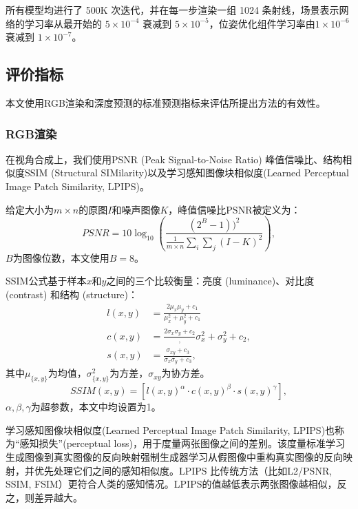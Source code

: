 所有模型均进行了 500K 次迭代，并在每一步渲染一组 1024 条射线，场景表示网络的学习率从最开始的 $5\times10^{-4}$ 衰减到 $5\times10^{-5}$，位姿优化组件学习率由$1\times10^{-6}$ 衰减到 $1\times10^{-7}$。

\subsection{评价指标}
本文使用RGB渲染和深度预测的标准预测指标来评估所提出方法的有效性。
\subsubsection{RGB渲染}
在视角合成上，我们使用PSNR (Peak Signal-to-Noise Ratio) 峰值信噪比、结构相似度SSIM (Structural SIMilarity)以及学习感知图像块相似度(Learned Perceptual Image Patch Similarity, LPIPS)。

给定大小为$m\times n$的原图$I$和噪声图像$K$，峰值信噪比PSNR被定义为：
\begin{equation}
    PSNR =  10\log_{10}(\frac{(2^B-1))^2}{\frac{1}{m\times n}\sum_i\sum_j(I-K)^2}),
\end{equation}
$B$为图像位数，本文使用$B=8$。

SSIM公式基于样本$x$和$y$之间的三个比较衡量：亮度 (luminance)、对比度 (contrast) 和结构 (structure)：
\begin{align}
    l(x,y) &= \frac{2\mu_x\mu_y+c_1}{\mu_x^2+\mu_y^2+c_1}\\
    c(x,y) &= \frac{2\sigma_x\sigma_y+c_2},{\sigma_x^2+\sigma_y^2+c_2},\\
    s(x,y) &= \frac{\sigma_{xy}+c_3}{\sigma_x\sigma_y+c_3},
\end{align}
其中$\mu_{\{x,y\}}$为均值，$\sigma_{\{x,y\}}^2$为方差，$\sigma_{xy}$为协方差。
\begin{equation}
    SSIM(x,y) = [l(x,y)^\alpha\cdot c(x,y)^\beta\cdot s(x,y)^\gamma],
\end{equation}
$\alpha, \beta, \gamma$为超参数，本文中均设置为1。

学习感知图像块相似度(Learned Perceptual Image Patch Similarity, LPIPS)\cite{zhang_unreasonable_2018}也称为“感知损失”(perceptual loss)，用于度量两张图像之间的差别。该度量标准学习生成图像到真实图像的反向映射强制生成器学习从假图像中重构真实图像的反向映射，并优先处理它们之间的感知相似度。LPIPS 比传统方法（比如L2/PSNR, SSIM, FSIM）更符合人类的感知情况。LPIPS的值越低表示两张图像越相似，反之，则差异越大。

